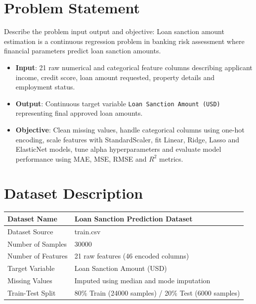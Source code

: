 \documentclass[12pt,a4paper]{article}
\begin{document}
\section{Problem Statement}
Describe the problem input output and objective:
Loan sanction amount estimation is a continuous regression problem in banking risk assessment where financial parameters predict loan sanction amounts.
\begin{itemize}
\item \textbf{Input}: 21 raw numerical and categorical feature columns describing applicant income, credit score, loan amount requested, property details and employment status.
\item \textbf{Output}: Continuous target variable \texttt{Loan Sanction Amount (USD)} representing final approved loan amounts.
\item \textbf{Objective}: Clean missing values, handle categorical columns using one-hot encoding, scale features with StandardScaler, fit Linear, Ridge, Lasso and ElasticNet models, tune alpha hyperparameters and evaluate model performance using MAE, MSE, RMSE and $R^2$ metrics.
\end{itemize}

\section{Dataset Description}
\begin{longtable}{|p{6cm}|p{8cm}|}
\hline
Dataset Name & Loan Sanction Prediction Dataset \\ \hline
Dataset Source & train.csv \\ \hline
Number of Samples & 30000 \\ \hline
Number of Features & 21 raw features (46 encoded columns) \\ \hline
Target Variable & Loan Sanction Amount (USD) \\ \hline
Missing Values & Imputed using median and mode imputation \\ \hline
Train-Test Split & 80\% Train (24000 samples) / 20\% Test (6000 samples) \\ \hline
\end{longtable}
\end{document}

